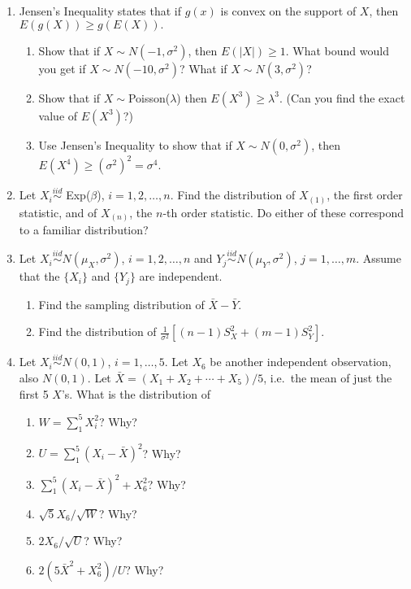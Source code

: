 \documentclass[12pt]{article}
\begin{document}
\begin{enumerate}
\item Jensen's Inequality states that if $g(x)$ is convex on the support of $X$,
 then $E(g(X)) \ge g(E(X)).$
  \begin{enumerate}
  \item Show that if $X \sim N(-1,\sigma^2)$, then $E(|X|)\ge 1.$
  What bound would you get if $X \sim N(-10,\sigma^2)$?  What if $X \sim N(3,\sigma^2)$?
  \item Show that if $X \sim $Poisson($\lambda$) then $E(X^3) \ge \lambda^3.$ (Can you find the
exact value of $E(X^3)$?)
  \item Use Jensen's Inequality to show that if $X \sim N(0,\sigma^2)$,
   then $E(X^4) \ge (\sigma^2)^2 = \sigma^4.$
  \end{enumerate}

\item Let $X_i \stackrel{iid}{\sim} $ Exp($\beta$), $i=1,2,\ldots,n$.
Find the distribution of $X_{(1)}$, the first order statistic, and
of $X_{(n)}$, the $n$-th order statistic.  Do either of these correspond to a familiar distribution?

\item
Let $X_i \stackrel{iid}{\sim} N(\mu_X,\sigma^2)$, $i=1,2,\ldots,n$ and
$Y_j \stackrel{iid}{\sim} N(\mu_Y,\sigma^2)$, $j = 1,\ldots,m$.
Assume that the $\{X_i\}$ and $\{Y_j\}$ are independent.
     \begin{enumerate}
     \item Find the sampling distribution of $\bar{X}-\bar{Y}$.
     \item Find the distribution of $\frac{1}{\sigma^2}[(n-1)S_X^2 + (m-1)S_Y^2]$.
     \end{enumerate}


\item Let $X_i \stackrel{iid}{\sim} N(0,1)$, $i=1,\ldots,5.$
Let $X_6$ be another independent observation, also $N(0,1)$.
Let $\bar{X} = (X_1 + X_2 + \cdots + X_5)/5$, i.e.\ the mean of just the first 5 $X$'s.
 What is the distribution of
\begin{enumerate}
\item $W = \sum_1^5 X_i^2$? Why?
\item $U = \sum_1^5 (X_i-\bar{X})^2$? Why?
\item $\sum_1^5 (X_i-\bar{X})^2+X_6^2$?  Why?
\item $\sqrt{5}X_6/\sqrt{W}$? Why?
\item $2X_6/\sqrt{U}$? Why?
\item $2(5\bar{X}^2 + X_6^2)/U$? Why?
\end{enumerate}

\end{enumerate}
\end{document}
